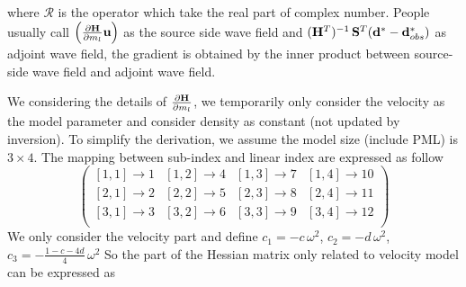 \documentclass[revised,endfloat]{geophysics}
\begin{document}
where ${\mathcal R}$ is the operator which take the real part of complex number. People usually call $\left( \frac{\partial {\bf H}}{\partial m_l} {\bf u} \right)$ as the source side wave field and $({\bf H}^T)^{-1} \,    {\bf S}^T ({\bf d}^* - {\bf d}_{obs}^*)$ as adjoint wave field, the gradient is obtained by the inner product between source-side wave field and adjoint wave field.

We considering the details of $\frac{\partial {\bf H}}{\partial m_l}$, we temporarily only consider the velocity as the model parameter and consider density as constant (not updated by inversion). To simplify the derivation, we assume the model size (include PML) is $3 \times 4$.
The mapping between sub-index and linear index are expressed as follow
\begin{equation}
\begin{pmatrix}
[1,1] \rightarrow 1 & [1,2] \rightarrow 4 & [1,3]\rightarrow 7 & [1,4]\rightarrow 10 \\
[2,1]\rightarrow 2 & [2,2]\rightarrow 5   & [2,3]\rightarrow 8 & [2,4]\rightarrow 11 \\
[3,1]\rightarrow 3 & [3,2] \rightarrow 6  & [3,3]\rightarrow 9 & [3,4]\rightarrow 12 \\
\end{pmatrix}
\end{equation}
We only consider the velocity part and define $c_1 = -c\, \omega^2$, $c_2 = - d\,\omega^2$, $c_3 = - \frac{1-c-4d}{4}\,\omega^2$
 So the part of the Hessian matrix only related to velocity model can be expressed as
\end{document}
